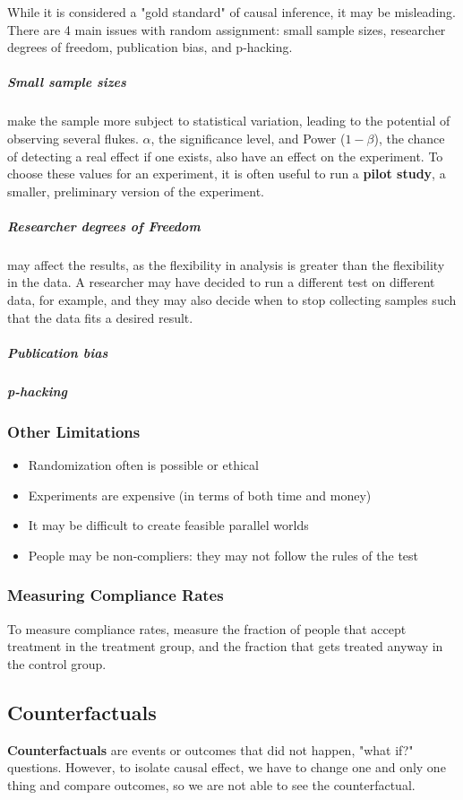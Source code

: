 While it is considered a "gold standard" of causal inference, it may be misleading. There are 4 main issues with random assignment: small sample sizes, researcher degrees of freedom, publication bias, and p-hacking.
\subparagraph{Small sample sizes} make the sample more subject to statistical variation, leading to the potential of observing several flukes. $\alpha$, the significance level, and Power ($1-\beta$), the chance of detecting a real effect if one exists, also have an effect on the experiment. To choose these values for an experiment, it is often useful to run a \textbf{pilot study}, a smaller, preliminary version of the experiment.
\subparagraph{Researcher degrees of Freedom} may affect the results, as the flexibility in analysis is greater than the flexibility in the data. A researcher may have decided to run a different test on different data, for example, and they may also decide when to stop collecting samples such that the data fits a desired result.
\subparagraph{Publication bias}
\subparagraph{p-hacking}

\subsubsection{Other Limitations}
\begin{itemize}
\item Randomization often is possible or ethical
\item Experiments are expensive (in terms of both time and money)
\item It may be difficult to create feasible parallel worlds
\item People may be non-compliers: they may not follow the rules of the test
\end{itemize}

\subsubsection{Measuring Compliance Rates}
To measure compliance rates, measure the fraction of people that accept treatment in the treatment group, and the fraction that gets treated anyway in the control group.

\subsection{Counterfactuals}

\textbf{Counterfactuals} are events or outcomes that did not happen, "what if?" questions. However, to isolate causal effect, we have to change one and only one thing and compare outcomes, so we are not able to see the counterfactual.

